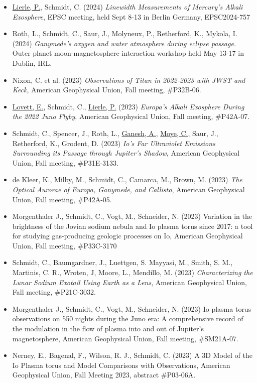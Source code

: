 \documentclass[12pt]{report}
\begin{document}
\begin{itemize}
   \item \underline{Lierle, P.}, Schmidt, C. (2024) \textit{Linewidth Measurements of Mercury's Alkali Exosphere}, EPSC meeting, held Sept 8-13 in Berlin Germany, EPSC2024-757
   \item Roth, L., Schmidt, C., Saur, J., Molyneux, P., Retherford, K., Mykola, I. (2024) \textit{Ganymede's oxygen and water atmosphere during eclipse passage.} Outer planet moon-magnetosphere interaction workshop held May 13-17 in Dublin, IRL.
   \item Nixon, C. et al. (2023) \textit{Observations of Titan in 2022-2023 with JWST and Keck}, American Geophysical Union, Fall meeting, \#P32B-06.
   \item \underline{Lovett, E.}, Schmidt, C., \underline{Lierle, P.} (2023) \textit{Europa's Alkali Exosphere During the 2022 Juno Flyby}, American Geophysical Union, Fall meeting, \#P42A-07.
   \item Schmidt, C., Spencer, J., Roth, L., \underline{Ganesh, A.}, \underline{Moye, C.}, Saur, J., Retherford, K., Grodent, D. (2023) \textit{Io's Far Ultraviolet Emissions Surrounding its Passage through Jupiter's Shadow}, American Geophysical Union, Fall meeting, \#P31E-3133.
   \item de Kleer, K., Milby, M., Schmidt, C., Camarca, M., Brown, M. (2023) \textit{The Optical Aurorae of Europa, Ganymede, and Callisto}, American Geophysical Union, Fall meeting, \#P42A-05.
   \item Morgenthaler J., Schmidt, C., Vogt, M., Schneider, N. (2023) Variation in the brightness of the Jovian sodium nebula and Io plasma torus since 2017: a tool for studying gas-producing geologic processes on Io, American Geophysical Union, Fall meeting, \#P33C-3170
   \item Schmidt, C., Baumgardner, J., Luettgen, S. Mayyasi, M., Smith, S. M., Martinis, C. R., Wroten, J, Moore, L., Mendillo, M. (2023) \textit{Characterizing the Lunar Sodium Exotail Using Earth as a Lens}, American Geophysical Union, Fall meeting, \#P21C-3032.
   \item Morgenthaler J., Schmidt, C., Vogt, M., Schneider, N. (2023) Io plasma torus observations on 550 nights during the Juno era: A comprehensive record of the modulation in the flow of plasma into and out of Jupiter's magnetosphere, American Geophysical Union, Fall meeting, \#SM21A-07.
   \item Nerney, E., Bagenal, F., Wilson, R. J., Schmidt, C. (2023) A 3D Model of the Io Plasma torus and Model Comparisons with Observations, American Geophysical Union, Fall Meeting 2023, abstract \#P03-06A. 

\end{itemize}
\end{document}
